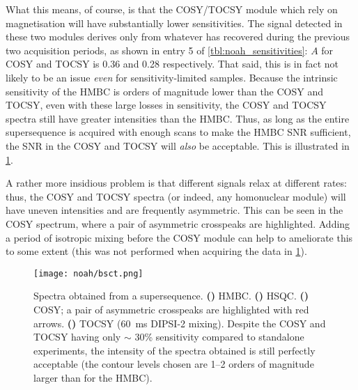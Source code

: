 What this means, of course, is that the COSY/TOCSY module which rely on  magnetisation will have substantially lower sensitivities.
The signal detected in these two modules derives only from whatever has recovered during the previous two acquisition periods, as shown in entry 5 of \cref{tbl:noah_sensitivities}: $A$ for COSY and TOCSY is 0.36 and 0.28 respectively.
That said, this is in fact not likely to be an issue \textit{even} for sensitivity-limited samples.
Because the intrinsic sensitivity of the HMBC is orders of magnitude lower than the COSY and TOCSY, even with these large losses in sensitivity, the COSY and TOCSY spectra still have greater intensities than the HMBC.
Thus, as long as the entire supersequence is acquired with enough scans to make the HMBC SNR sufficient, the SNR in the COSY and TOCSY will \textit{also} be acceptable.
This is illustrated in \cref{fig:bsct}.

A rather more insidious problem is that different signals relax at different rates: thus, the COSY and TOCSY spectra (or indeed, any homonuclear module) will have uneven intensities and are frequently asymmetric.
This can be seen in the COSY spectrum, where a pair of asymmetric crosspeaks are highlighted.
Adding a period of isotropic mixing before the COSY module\autocite{Kupce2018CC} can help to ameliorate this to some extent (this was not performed when acquiring the data in \cref{fig:bsct}).

\begin{figure}[!ht]
    \centering
    \texttt{[image: noah/bsct.png]}%
    {\label{fig:bsct_b}}%
    {\label{fig:bsct_s}}%
    {\label{fig:bsct_c}}%
    {\label{fig:bsct_t}}%
    \caption[Spectra obtained from a  supersequence.]{
        Spectra obtained from a  supersequence. 
        \textbf{()} HMBC.
        \textbf{()} HSQC.
        \textbf{()} COSY; a pair of asymmetric crosspeaks are highlighted with red arrows.
        \textbf{()} TOCSY (\qty{60}{\ms} DIPSI-2 mixing).
        Despite the COSY and TOCSY having only $\sim$ 30\% sensitivity compared to standalone experiments, the intensity of the spectra obtained is still perfectly acceptable (the contour levels chosen are 1--2 orders of magnitude larger than for the HMBC).
    }
    \label{fig:bsct}
\end{figure}


